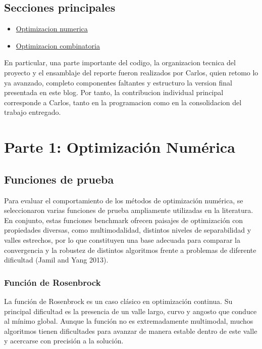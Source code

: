 \documentclass[
  12pt,
  letterpaper,
  DIV=11,
  numbers=noendperiod]{scrartcl}
\providecommand{\tightlist}{%
  \setlength{\itemsep}{0pt}\setlength{\parskip}{0pt}}
\begin{document}
\subsection{Secciones principales}\label{secciones-principales}

\begin{itemize}
\tightlist
\item
  \href{./numerica.qmd}{Optimizacion numerica}
\item
  \href{./combinatoria.qmd}{Optimizacion combinatoria}
\end{itemize}

En particular, una parte importante del codigo, la organizacion tecnica
del proyecto y el ensamblaje del reporte fueron realizados por Carlos,
quien retomo lo ya avanzado, completo componentes faltantes y estructuro
la version final presentada en este blog. Por tanto, la contribucion
individual principal corresponde a Carlos, tanto en la programacion como
en la consolidacion del trabajo entregado.

\section{Parte 1: Optimización
Numérica}\label{parte-1-optimizaciuxf3n-numuxe9rica}

\subsection{Funciones de prueba}\label{funciones-de-prueba}

Para evaluar el comportamiento de los métodos de optimización numérica,
se seleccionaron varias funciones de prueba ampliamente utilizadas en la
literatura. En conjunto, estas funciones benchmark ofrecen paisajes de
optimización con propiedades diversas, como multimodalidad, distintos
niveles de separabilidad y valles estrechos, por lo que constituyen una
base adecuada para comparar la convergencia y la robustez de distintos
algoritmos frente a problemas de diferente dificultad (Jamil and Yang
2013).

\subsubsection{Función de Rosenbrock}\label{funciuxf3n-de-rosenbrock}

La función de Rosenbrock es un caso clásico en optimización continua. Su
principal dificultad es la presencia de un valle largo, curvo y angosto
que conduce al mínimo global. Aunque la función no es extremadamente
multimodal, muchos algoritmos tienen dificultades para avanzar de manera
estable dentro de este valle y acercarse con precisión a la solución.
\end{document}
